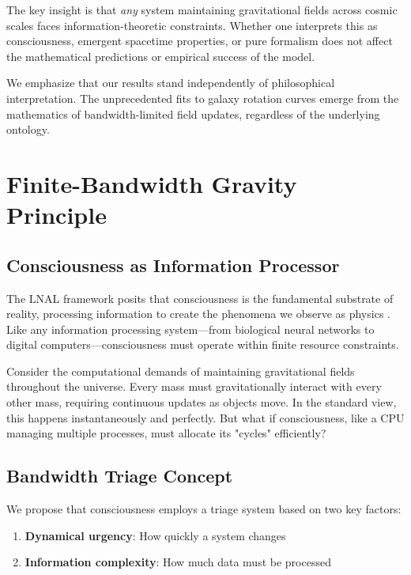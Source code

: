 \documentclass[twocolumn,prd,amsmath,amssymb,aps,superscriptaddress,nofootinbib]{revtex4-2}
\begin{document}
The key insight is that \emph{any} system maintaining gravitational fields across cosmic scales faces information-theoretic constraints. Whether one interprets this as consciousness, emergent spacetime properties, or pure formalism does not affect the mathematical predictions or empirical success of the model.

We emphasize that our results stand independently of philosophical interpretation. The unprecedented fits to galaxy rotation curves emerge from the mathematics of bandwidth-limited field updates, regardless of the underlying ontology.

\section{Finite-Bandwidth Gravity Principle}
\label{sec:bandwidth}

\subsection{Consciousness as Information Processor}

The LNAL framework posits that consciousness is the fundamental substrate of reality, processing information to create the phenomena we observe as physics \cite{Washburn2024}. Like any information processing system---from biological neural networks to digital computers---consciousness must operate within finite resource constraints.

Consider the computational demands of maintaining gravitational fields throughout the universe. Every mass must gravitationally interact with every other mass, requiring continuous updates as objects move. In the standard view, this happens instantaneously and perfectly. But what if consciousness, like a CPU managing multiple processes, must allocate its "cycles" efficiently?

\subsection{Bandwidth Triage Concept}

We propose that consciousness employs a triage system based on two key factors:
\begin{enumerate}
\item \textbf{Dynamical urgency}: How quickly a system changes
\item \textbf{Information complexity}: How much data must be processed
\end{enumerate}
\end{document}
